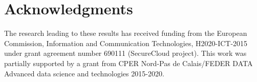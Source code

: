\documentclass[sigconf,table]{acmart}
\begin{document}

\maketitle





%











% 




\section*{Acknowledgments}
The research leading to these results has received funding from the European Commission, Information and Communication Technologies, H2020-ICT-2015 under grant agreement number 690111 (SecureCloud project).
This work was partially supported by a grant from CPER Nord-Pas de Calais/FEDER DATA Advanced data science and technologies 2015-2020.


{


}
\end{document}
